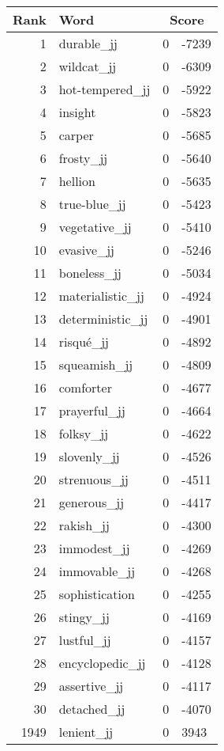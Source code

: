 \begin{longtable}[!htbp]{| rlr@{.}l |}
    \hline
    \textbf{Rank} & \textbf{Word} & \multicolumn{2}{c|}{\textbf{Score}} \\
    \hline
    \endhead
    1 & durable\_jj & 0 & -7239 \\
    2 & wildcat\_jj & 0 & -6309 \\
    3 & hot-tempered\_jj & 0 & -5922 \\
    4 & insight & 0 & -5823 \\
    5 & carper & 0 & -5685 \\
    6 & frosty\_jj & 0 & -5640 \\
    7 & hellion & 0 & -5635 \\
    8 & true-blue\_jj & 0 & -5423 \\
    9 & vegetative\_jj & 0 & -5410 \\
    10 & evasive\_jj & 0 & -5246 \\
    11 & boneless\_jj & 0 & -5034 \\
    12 & materialistic\_jj & 0 & -4924 \\
    13 & deterministic\_jj & 0 & -4901 \\
    14 & risqué\_jj & 0 & -4892 \\
    15 & squeamish\_jj & 0 & -4809 \\
    16 & comforter & 0 & -4677 \\
    17 & prayerful\_jj & 0 & -4664 \\
    18 & folksy\_jj & 0 & -4622 \\
    19 & slovenly\_jj & 0 & -4526 \\
    20 & strenuous\_jj & 0 & -4511 \\
    21 & generous\_jj & 0 & -4417 \\
    22 & rakish\_jj & 0 & -4300 \\
    23 & immodest\_jj & 0 & -4269 \\
    24 & immovable\_jj & 0 & -4268 \\
    25 & sophistication & 0 & -4255 \\
    26 & stingy\_jj & 0 & -4169 \\
    27 & lustful\_jj & 0 & -4157 \\
    28 & encyclopedic\_jj & 0 & -4128 \\
    29 & assertive\_jj & 0 & -4117 \\
    30 & detached\_jj & 0 & -4070 \\
    1949 & lenient\_jj & 0 & 3943 \\

\end{longtable}
